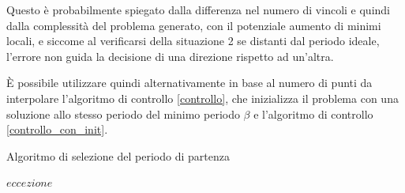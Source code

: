 \documentclass[a4paper,12pt]{report}
\begin{document}
Questo è probabilmente spiegato dalla differenza nel numero di vincoli e quindi dalla complessità del problema generato, con il potenziale aumento di minimi locali, e siccome al verificarsi della situazione 2 se distanti dal periodo ideale, l'errore non guida la decisione di una direzione rispetto ad un'altra.

È possibile utilizzare quindi alternativamente in base al numero di punti da interpolare l'algoritmo di controllo \ref{controllo}, che inizializza il problema con una soluzione allo stesso periodo del minimo periodo $\beta$ e l'algoritmo di controllo \ref{controllo_con_init}.

\begin{algorithm} [H]
  \caption{Algoritmo di selezione del periodo di partenza}
  \label{controlloInit}

  \BlankLine

  \If{$\Sol[periodo] = \perPart$} {
    \Return $eccezione$
  }
  \Return \nperPart

\end{algorithm}
\end{document}

